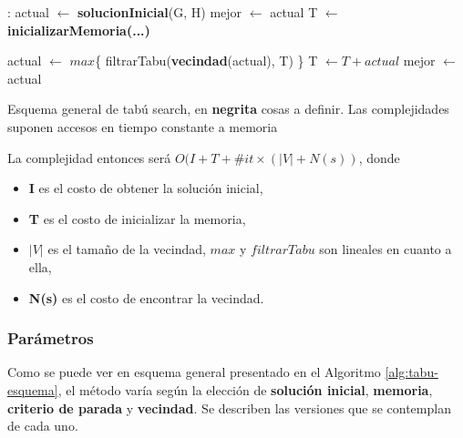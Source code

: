 \begin{algorithm}[H]
    \begin{algorithmic}[1]
        \State
        :
            \State actual $\gets$ \textbf{solucionInicial}(G, H) 
            \State mejor $\gets$ actual
            \State T $\gets$ \textbf{inicializarMemoria(...)} 
            
             
                \State actual $\gets$ $max$\{ filtrarTabu(\textbf{vecindad}(actual), T) \} 
                \State T $\gets T + actual$ 
                    \State mejor $\gets$ actual
                \EndIf
            \EndWhile
        \EndFunction
    \end{algorithmic}
    \caption{Esquema general de tabú search, en \textbf{negrita} cosas a definir. Las complejidades suponen accesos en tiempo constante a memoria}
    \label{alg:tabu-esquema}
\end{algorithm}

La complejidad entonces será $O(I + T + \#it \times (|V| + N(s))$, donde

\begin{itemize}
    \item \textbf{I} es el costo de obtener la solución inicial,
    \item \textbf{T} es el costo de inicializar la memoria,
    \item \textbf{$|V|$} es el tamaño de la vecindad, $max$ y $filtrarTabu$ son lineales en cuanto a ella,
    \item \textbf{N(s)} es el costo de encontrar la vecindad.
\end{itemize}

\subsubsection{Parámetros}

Como se puede ver en esquema general presentado en el Algoritmo \ref{alg:tabu-esquema}, el método varía según la elección de \textbf{solución inicial}, \textbf{memoria}, \textbf{criterio de parada} y \textbf{vecindad}. Se describen las versiones que se contemplan de cada uno.

